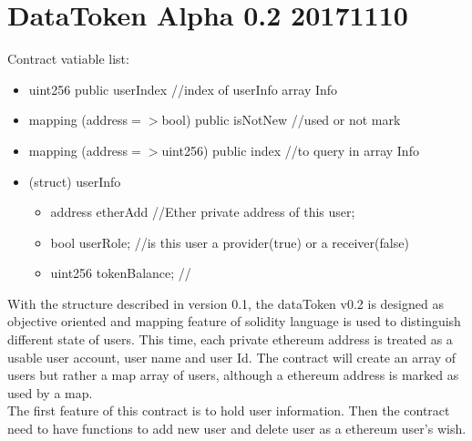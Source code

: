 \section{DataToken Alpha 0.2 20171110}
Contract vatiable list:
\begin{itemize}
    \item uint256 public userIndex //index of userInfo array Info
    \item mapping (address$=>$bool) public isNotNew //used or not mark
    \item mapping (address$=>$uint256) public index //to query in array Info
    \item (struct) userInfo 
    \begin{itemize}
        \item address etherAdd //Ether private address of this user;
        \item bool userRole; //is this user a provider(true) or a receiver(false)
        \item uint256 tokenBalance; //
    \end{itemize}
    
\end{itemize}
With the structure described in version 0.1, the dataToken v0.2
is designed as objective oriented and mapping feature of solidity language
is used to distinguish different state of users. This time, each 
private ethereum address is treated as a usable user account, user name
and user Id. The contract will create an array of users but rather a map 
array of users, although a ethereum address is marked as used by a map.\\
The first feature of this contract is to hold user information. Then 
the contract need to have functions to add new user and delete user as
a ethereum user's wish.

